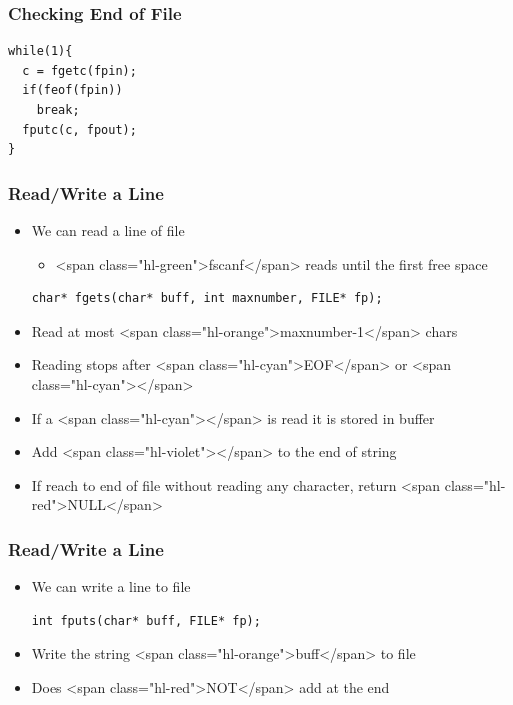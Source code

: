 \documentclass{../c-lecture}
\begin{document}
\begin{frame}
  \frametitle{Checking End of File}
  \begin{verbatim}
while(1){
  c = fgetc(fpin);
  if(feof(fpin))
    break;
  fputc(c, fpout);
}
  \end{verbatim}
\end{frame}
\begin{frame}
  \frametitle{Read/Write a Line}
  \begin{itemize}
    \item We can read a line of file
    \begin{itemize}
      \item
        <span class="hl-green">fscanf</span> reads until the first free space

    \end{itemize}
    \begin{verbatim}
char* fgets(char* buff, int maxnumber, FILE* fp);
    \end{verbatim}
    \item Read at most <span class="hl-orange">maxnumber-1</span> chars
    \item
      Reading stops after <span class="hl-cyan">EOF</span> or
      <span class="hl-cyan">\n</span>

    \item If a <span class="hl-cyan">\n</span> is read it is stored in buffer
    \item Add <span class="hl-violet">\0</span> to the end of string
    \item
      If reach to end of file without reading any character, return
      <span class="hl-red">NULL</span>

  \end{itemize}
\end{frame}
\begin{frame}
  \frametitle{Read/Write a Line}
  \begin{itemize}
    \item We can write a line to file
    \begin{verbatim}
int fputs(char* buff, FILE* fp);
    \end{verbatim}
    \item Write the string <span class="hl-orange">buff</span> to file
    \item Does <span class="hl-red">NOT</span> add \n at the end
  \end{itemize}
\end{frame}
\end{document}
